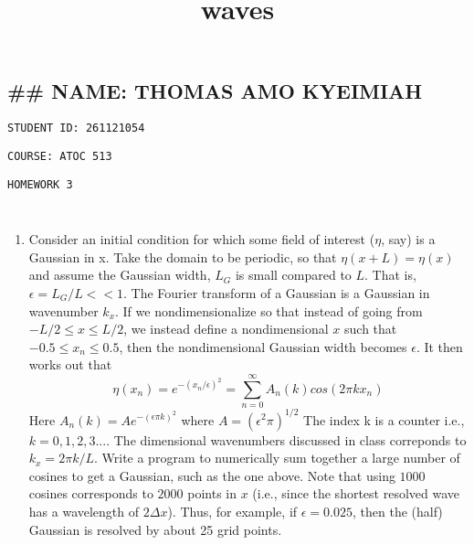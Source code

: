 \documentclass[11pt]{article}
\title{waves}
\makeatletter
\providecommand{\tightlist}{%
      \setlength{\itemsep}{0pt}\setlength{\parskip}{0pt}}
\newcommand{\boxspacing}{\kern\kvtcb@left@rule\kern\kvtcb@boxsep}
\newcommand{\prompt}[4]{
        {\ttfamily\llap{{\color{#2}[#3]:\hspace{3pt}#4}}\vspace{-\baselineskip}}
    }
\makeatother
\begin{document}
    
    \maketitle
    
    

    
    \hypertarget{name-thomas-amo-kyeimiah}{%
\subsection{\#\# NAME: THOMAS AMO
KYEIMIAH}\label{name-thomas-amo-kyeimiah}}

    \texttt{STUDENT\ ID:\ 261121054}

\texttt{COURSE:\ ATOC\ 513}

\texttt{HOMEWORK\ 3}

    \begin{tcolorbox}[breakable, size=fbox, boxrule=1pt, pad at break*=1mm,colback=cellbackground, colframe=cellborder]
\prompt{In}{incolor}{ }{\boxspacing}
\begin{Verbatim}[commandchars=\\\{\}]

\end{Verbatim}
\end{tcolorbox}

    \begin{tcolorbox}[breakable, size=fbox, boxrule=1pt, pad at break*=1mm,colback=cellbackground, colframe=cellborder]
\prompt{In}{incolor}{ }{\boxspacing}
\begin{Verbatim}[commandchars=\\\{\}]

\end{Verbatim}
\end{tcolorbox}

    \begin{enumerate}
\def\labelenumi{\arabic{enumi}.}
\tightlist
\item
  Consider an initial condition for which some field of interest
  (\(\eta\), say) is a Gaussian in x. Take the domain to be periodic, so
  that \(\eta (x + L) = \eta(x)\) and assume the Gaussian width, \(L_G\)
  is small compared to \(L\). That is, \(\epsilon = L_G/L << 1\). The
  Fourier transform of a Gaussian is a Gaussian in wavenumber \(k_x\).
  If we nondimensionalize so that instead of going from
  \(−L/2 ≤ x ≤ L/2\), we instead define a nondimensional \(x\) such that
  \(−0.5 ≤ x_n ≤ 0.5\), then the nondimensional Gaussian width becomes
  \(\epsilon\). It then works out that
  \[\eta(x_n) = e^{-(x_n/\epsilon)^2}= \sum_{n=0}^{\infty}A_n(k) cos(2\pi kx_n)\]
  Here \(A_n(k) = Ae^{-(\epsilon \pi k)^2}\) where
  \(A = (\epsilon^2 \pi)^{1/2}\) The index k is a counter i.e.,
  \(k = 0, 1, 2, 3. . . .\) The dimensional wavenumbers discussed in
  class correponds to \(k_x = 2\pi k/L\). Write a program to numerically
  sum together a large number of cosines to get a Gaussian, such as the
  one above. Note that using \(1000\) cosines corresponds to \(2000\)
  points in \(x\) (i.e., since the shortest resolved wave has a
  wavelength of \(2\Delta x\)). Thus, for example, if
  \(\epsilon = 0.025\), then the (half) Gaussian is resolved by about 25
  grid points.
\end{enumerate}
\end{document}
